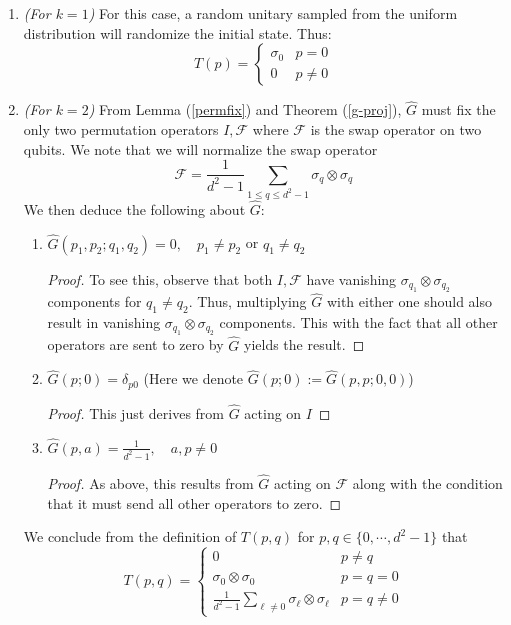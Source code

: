 \documentclass[12pt]{amsart}
\theoremstyle{definition}
\theoremstyle{remark}
\numberwithin{equation}{section}
\theoremstyle{remark}
\begin{document}
\begin{enumerate}
  \item \emph{(For $k = 1$)} For this case, a random unitary sampled from the uniform distribution will randomize the initial state. Thus:
  $$
  T(p) = \begin{cases}
    \sigma_0 & p = 0 \\
    0 & p \neq 0
  \end{cases}
  $$
  \item \emph{(For $k=2$)} From Lemma (\ref{permfix}) and Theorem (\ref{g-proj}), $\widehat{G}$ must fix the only two permutation operators $I, \mathcal{F}$ where $\mathcal{F}$ is the swap operator on two qubits. We note that we will normalize the swap operator
  \begin{equation}
    \mathcal{F} = \frac{1}{d^2 -1 }\sum_{1 \leq q \leq d^2 -1} \sigma_{q} \otimes \sigma_{q}
  \end{equation}
  We then deduce the following about $\widehat{G}$: \newline
    \begin{enumerate}
      \item $\widehat{G}(p_1,p_2;q_1,q_2) = 0, \quad p_1 \neq p_2$ or $q_1 \neq q_2$
      \begin{proof}
        To see this, observe that both $I, \mathcal{F}$ have vanishing $\sigma_{q_1} \otimes \sigma_{q_2}$ components for $q_1 \neq q_2$. Thus, multiplying $\widehat{G}$ with either one should also result in vanishing $\sigma_{q_1} \otimes \sigma_{q_2}$ components. This with the fact that all other operators are sent to zero by $\widehat{G}$ yields the result.
      \end{proof}

      \item $\widehat{G}(p;0) = \delta_{p0}$ (Here we denote $\widehat{G}(p;0) := \widehat{G}(p,p;0,0)$)
      \begin{proof}
        This just derives from $\widehat{G}$ acting on $I$
      \end{proof}

      \item $\widehat{G}(p,a) = \frac{1}{d^2-1}, \quad a,p \neq 0$
      \begin{proof}
        As above, this results from $\widehat{G}$ acting on $\mathcal{F}$ along with the condition that it must send all other operators to zero.
      \end{proof}
    \end{enumerate}
    We conclude from the definition of $T(p,q)$ for $p,q \in \{0,\cdots,d^2-1\}$ that
    \begin{equation}
      T(p,q) = \begin{cases}
        0 \quad & p \neq q \\
        \sigma_0 \otimes \sigma_0 & p = q = 0 \\
        \frac{1}{d^2 - 1}\sum_{\ell \neq 0}  \sigma_\ell \otimes \sigma_\ell & p = q \neq 0
      \end{cases}
    \end{equation}
\end{enumerate}
\end{document}
